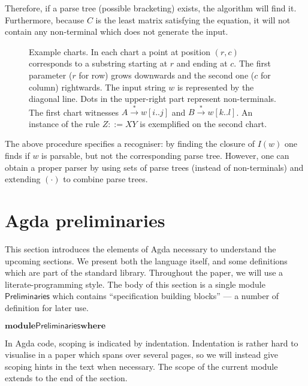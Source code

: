 \documentclass{CSML}
\numberwithin{theorem}{section}
\newcommand{\kw}[1]{\ensuremath{\mathbf{#1}}}
\newcommand{\Conid}[1]{\mathit{#1}}
\def\resethooks{\global\let\SaveRestoreHook\empty
  \global\let\ColumnHook\empty}
\let\hspost\empty
\newcommand{\subt}[3] {
  \draw[grid] (#1,#1) -- (#1,#2) node[inChart] {#3} -- (#2,#2);
  \fill[color=black] (#1,#2) circle (2pt)
 }
\renewcommand\Conid[1]{\ensuremath{\mathsf{#1}}}
\newcommand{\generates}[1][]{\stackrel{#1}{\longrightarrow}}
\newcommand{\generatestrans}{\generates[*]}
\begin{document}
Therefore, if a parse tree (possible bracketing) exists, the algorithm
will find it.
Furthermore, because $C$ is the least matrix satisfying the equation,
it will not contain any non-terminal which does not generate the
input.


\newcommand{\mrk}[2]{\node[inChart] at (#1,#1) {#2}}
\begin{figure}
\centering
  \quad
  \caption{Example charts.
In each chart a point at position $(r,c)$ corresponds to a substring starting at $r$ and ending at $c$.
The first parameter ($r$ for row) grows downwards and the second
    one ($c$ for column) rightwards.
The input string $w$ is represented by the diagonal line.
Dots in the upper-right part represent non-terminals.
The first chart witnesses $A \generatestrans w[i..j]$ and
    $B \generatestrans w[k..l]$.
An instance of the rule $Z ::= X Y$ is exemplified on the second chart.
}
  \label{fig:chart}
\end{figure}


The above procedure specifies a recogniser: by finding the closure of
$I(w)$ one finds if $w$ is parsable, but not the corresponding parse
tree.  However, one can obtain a proper parser by using sets of parse
trees (instead of non-terminals) and extending $(\cdot)$ to combine
parse trees.


\section{Agda preliminaries}\label{sec:prel}


This section introduces the elements of Agda necessary to
understand the upcoming sections.
We present both the language itself, and some definitions which are
part of the standard library.
Throughout the paper, we will use a literate-programming style.
The body of this section is a single module \ensuremath{\Conid{Preliminaries}} which
contains ``specification building blocks'' --- a number of definition
for later use.
\begin{hscode}\SaveRestoreHook
\column{B}{@{}>{\hspre}l<{\hspost}@{}}\column{E}{@{}>{\hspre}l<{\hspost}@{}}\>[B]{}\kw{module}\;\Conid{Preliminaries}\;\kw{where}{}\<[E]\ColumnHook
\end{hscode}\resethooks
In Agda code, scoping is indicated by indentation.
Indentation is rather hard to visualise in a paper which spans over
several pages, so we will instead give scoping hints in the text when
necessary.
The scope of the current module extends to the end of the section.
\end{document}
